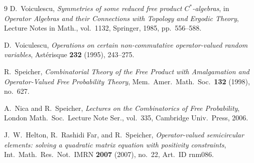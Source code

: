 \documentclass[11pt,a4paper]{article}
\theoremstyle{definition}
\begin{document}
\begin{thebibliography}{9}
D.~Voiculescu, \emph{Symmetries of some reduced free product $C^*$-algebras}, in \emph{Operator Algebras and their Connections with Topology and Ergodic Theory}, Lecture Notes in Math., vol.~1132, Springer, 1985, pp.~556--588.

D.~Voiculescu, \emph{Operations on certain non-commutative operator-valued random variables}, Ast\'erisque \textbf{232} (1995), 243--275.

R.~Speicher, \emph{Combinatorial Theory of the Free Product with Amalgamation and Operator-Valued Free Probability Theory}, Mem.\ Amer.\ Math.\ Soc.\ \textbf{132} (1998), no.~627.

A.~Nica and R.~Speicher, \emph{Lectures on the Combinatorics of Free Probability}, London Math.\ Soc.\ Lecture Note Ser., vol.~335, Cambridge Univ.\ Press, 2006.

J.~W.~Helton, R.~Rashidi Far, and R.~Speicher, \emph{Operator-valued semicircular elements: solving a quadratic matrix equation with positivity constraints}, Int.\ Math.\ Res.\ Not.\ IMRN \textbf{2007} (2007), no.~22, Art.\ ID rnm086.
\end{thebibliography}
\end{document}
